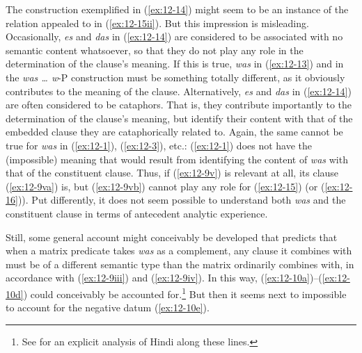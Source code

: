 \documentclass[output=paper]{langsci/langscibook}
\begin{document}
The construction exemplified in (\ref{ex:12-14}) might seem to be an instance of
the relation appealed to in (\ref{ex:12-15ii}). But this impression is
misleading.  Occasionally, \textit{es} and \textit{das} in (\ref{ex:12-14}) are
considered to be associated with no semantic content whatsoever, so
that they do not play any role in the determination of the clause's
meaning. If this is true, \textit{was} in (\ref{ex:12-13}) and in the \textit{was \ldots{}  w}-P construction must be something totally different, as it
obviously contributes to the meaning of the clause. Alternatively,
\textit{es} and \textit{das} in (\ref{ex:12-14}) are often considered to be
cataphors. That is, they contribute importantly to the determination
of the clause's meaning, but identify their content with that of the
embedded clause they are cataphorically related to. Again, the same
cannot be true for \textit{was} in (\ref{ex:12-1}), (\ref{ex:12-3}), etc.: (\ref{ex:12-1}) does not have
the (impossible) meaning  that would
result from identifying the content of \textit{was} with that of the
constituent clause. Thus, if (\ref{ex:12-9v}) is relevant at all, its clause
(\ref{ex:12-9va}) is, but (\ref{ex:12-9vb}) cannot play any role for (\ref{ex:12-15}) (or (\ref{ex:12-16})). Put
differently, it does not seem possible to understand both \textit{was}
and the constituent clause in terms of antecedent analytic experience.

Still, some general account might conceivably be developed that
predicts that when a matrix predicate takes \textit{was} as a 
complement, any clause it combines with must be of a different
semantic type than the matrix ordinarily combines with, in accordance
with (\ref{ex:12-9iii}) and (\ref{ex:12-9iv}). In this way, (\ref{ex:12-10a})--(\ref{ex:12-10d}) could conceivably
be accounted for.\footnote{%
	See \citet{Dayal1994} for an explicit analysis
  of Hindi along these lines.%
}
But then it seems next to impossible to
account for the negative datum (\ref{ex:12-10e}).
\end{document}
